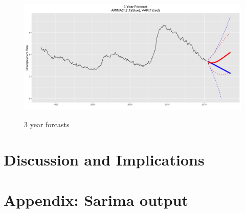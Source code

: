 \documentclass[twoside,twocolumn]{article}
\begin{document}
       \begin{figure}[H]
    	\centering
     	\caption{3 year forcasts}
     	\includegraphics[width=\linewidth]{images/forcast3}
     	\label{fig:forcasts}
      \end{figure}

\section{Discussion and Implications}

\blindtext %


\begin{flushleft}
\end{flushleft}

\appendix
\section{Appendix: Sarima output} \label{App:AppendixA}
\end{document}
